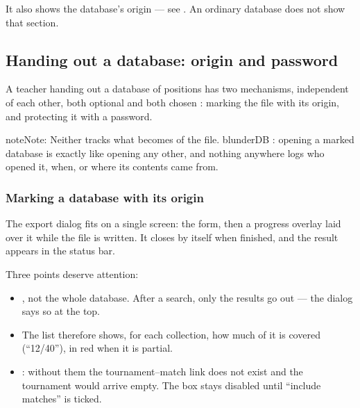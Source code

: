 \documentclass[letterpaper,10pt,english]{sphinxmanual}
\begin{document}
\sphinxAtStartPar
It also shows the database’s origin  — see {\hyperref[\detokenize{manuel:diffusion-controlee}]{}}. An ordinary database does not show that section.


\subsection{Handing out a database: origin and password}
\label{\detokenize{manuel:diffuser-une-base-origine-et-mot-de-passe}}\label{\detokenize{manuel:diffusion-controlee}}
\sphinxAtStartPar
A teacher handing out a database of positions has two mechanisms, independent of each other, both optional and both chosen : marking the file with its origin, and protecting it with a password.

\begin{sphinxadmonition}{note}{Note:}
\sphinxAtStartPar
Neither tracks what becomes of the file. blunderDB : opening a marked database is exactly like opening any other, and nothing anywhere logs who opened it, when, or where its contents came from.
\end{sphinxadmonition}


\subsubsection{Marking a database with its origin}
\label{\detokenize{manuel:marquer-une-base-de-son-origine}}
\sphinxAtStartPar
The export dialog fits on a single screen: the form, then a progress overlay laid over it while the file is written. It closes by itself when finished, and the result appears in the status bar.

\sphinxAtStartPar
Three points deserve attention:
\begin{itemize}
\item {} 
\sphinxAtStartPar
{}, not the whole database. After a search, only the results go out — the dialog says so at the top.

\item {} 
\sphinxAtStartPar
{} The list therefore shows, for each collection, how much of it is covered (“12/40”), in red when it is partial.

\item {} 
\sphinxAtStartPar
{}: without them the tournament–match link does not exist and the tournament would arrive empty. The box stays disabled until “include matches” is ticked.

\end{itemize}
\end{document}

